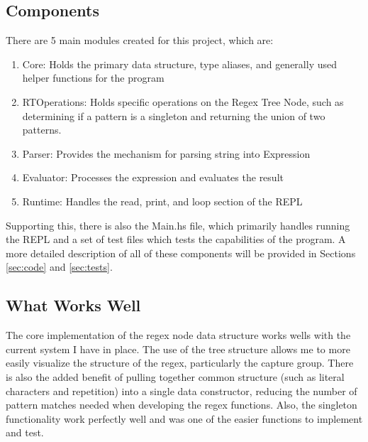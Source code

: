 \documentclass[letterpaper, 11pt]{article}
\begin{document}
\subsection{Components}\label{sec:components}
There are 5 main modules created for this project, which are:
\begin{enumerate}
    \item Core: Holds the primary data structure, type aliases, and generally used helper functions for the program
    \item RTOperations: Holds specific operations on the Regex Tree Node, such as determining if a pattern is a singleton and returning the union of two patterns.
    \item Parser: Provides the mechanism for parsing string into Expression
    \item Evaluator: Processes the expression and evaluates the result
    \item Runtime: Handles the read, print, and loop section of the REPL
\end{enumerate}
Supporting this, there is also the Main.hs file, which primarily handles running the REPL and a set of test files which tests the capabilities of the program.
A more detailed description of all of these components will be provided in Sections \ref*{sec:code} and \ref*{sec:tests}.

\subsection{What Works Well}\label{sec:working}
The core implementation of the regex node data structure works wells with the current system I have in place.
The use of the tree structure allows me to more easily visualize the structure of the regex, particularly the capture group.
There is also the added benefit of pulling together common structure (such as literal characters and repetition) into a single data constructor, reducing the number of pattern matches needed when developing the regex functions. 
Also, the singleton functionality work perfectly well and was one of the easier functions to implement and test.
\end{document}
